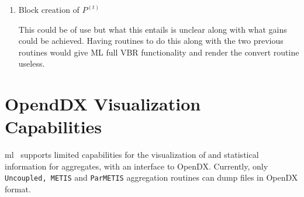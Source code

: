 \documentclass[10pt,letter,relax]{SANDreport}
\newcommand{\ML}     {{\sc ml }}
\begin{document}
\begin{enumerate}
\begin{enumerate}
\item Block creation of $P^{(t)}$

This could be of use but what this entails is unclear along with what gains could be achieved.  Having routines to do this along with the two previous routines would give ML full VBR functionality and render the convert routine useless.

\end{enumerate}
\end{enumerate}


\section{OpendDX Visualization Capabilities}
\label{sec:viz}

\ML\ supports limited capabilities for the visualization of and statistical
information for aggregates, with an interface to OpenDX.
Currently, only {\tt Uncoupled,
METIS} and {\tt ParMETIS} aggregation routines can dump files in OpenDX
format.
\end{document}
